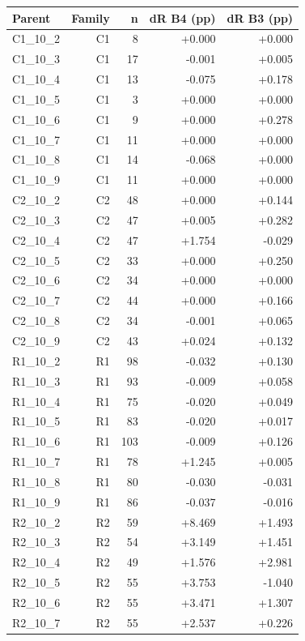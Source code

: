 \begingroup
\small
\setlength{\tabcolsep}{3pt}
\begin{longtable}{@{}lrrrr@{}}
\toprule
Parent & Family & n & dR B4 (pp) & dR B3 (pp) \\
\midrule
\endhead
C1\_10\_2 & C1 & 8 & +0.000 & +0.000 \\
C1\_10\_3 & C1 & 17 & -0.001 & +0.005 \\
C1\_10\_4 & C1 & 13 & -0.075 & +0.178 \\
C1\_10\_5 & C1 & 3 & +0.000 & +0.000 \\
C1\_10\_6 & C1 & 9 & +0.000 & +0.278 \\
C1\_10\_7 & C1 & 11 & +0.000 & +0.000 \\
C1\_10\_8 & C1 & 14 & -0.068 & +0.000 \\
C1\_10\_9 & C1 & 11 & +0.000 & +0.000 \\
C2\_10\_2 & C2 & 48 & +0.000 & +0.144 \\
C2\_10\_3 & C2 & 47 & +0.005 & +0.282 \\
C2\_10\_4 & C2 & 47 & +1.754 & -0.029 \\
C2\_10\_5 & C2 & 33 & +0.000 & +0.250 \\
C2\_10\_6 & C2 & 34 & +0.000 & +0.000 \\
C2\_10\_7 & C2 & 44 & +0.000 & +0.166 \\
C2\_10\_8 & C2 & 34 & -0.001 & +0.065 \\
C2\_10\_9 & C2 & 43 & +0.024 & +0.132 \\
R1\_10\_2 & R1 & 98 & -0.032 & +0.130 \\
R1\_10\_3 & R1 & 93 & -0.009 & +0.058 \\
R1\_10\_4 & R1 & 75 & -0.020 & +0.049 \\
R1\_10\_5 & R1 & 83 & -0.020 & +0.017 \\
R1\_10\_6 & R1 & 103 & -0.009 & +0.126 \\
R1\_10\_7 & R1 & 78 & +1.245 & +0.005 \\
R1\_10\_8 & R1 & 80 & -0.030 & -0.031 \\
R1\_10\_9 & R1 & 86 & -0.037 & -0.016 \\
R2\_10\_2 & R2 & 59 & +8.469 & +1.493 \\
R2\_10\_3 & R2 & 54 & +3.149 & +1.451 \\
R2\_10\_4 & R2 & 49 & +1.576 & +2.981 \\
R2\_10\_5 & R2 & 55 & +3.753 & -1.040 \\
R2\_10\_6 & R2 & 55 & +3.471 & +1.307 \\
R2\_10\_7 & R2 & 55 & +2.537 & +0.226 \\

\end{longtable}
